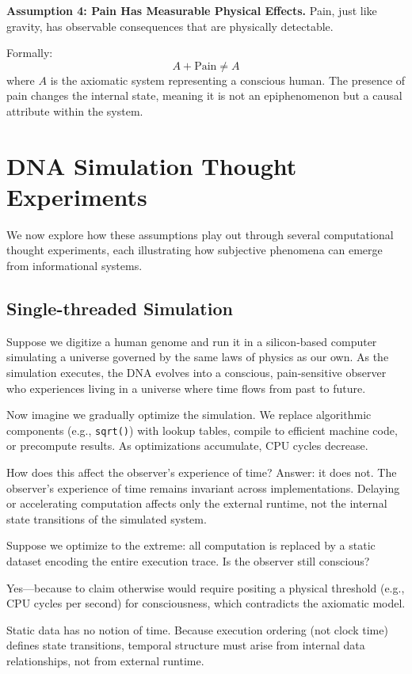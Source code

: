 \documentclass[11pt]{article}
\begin{document}
\textbf{Assumption 4: Pain Has Measurable Physical Effects.}
Pain, just like gravity, has observable consequences that are physically detectable.

Formally:
\[
  A + \text{Pain} \neq A
\]
where \( A \) is the axiomatic system representing a conscious human. The presence of pain changes the internal state, meaning it is not an epiphenomenon but a causal attribute within the system.


\section{DNA Simulation Thought Experiments}

We now explore how these assumptions play out through several computational thought experiments, each illustrating how subjective phenomena can emerge from informational systems.

\subsection{Single-threaded Simulation}

Suppose we digitize a human genome and run it in a silicon-based computer simulating a universe governed by the same laws of physics as our own. As the simulation executes, the DNA evolves into a conscious, pain-sensitive observer who experiences living in a universe where time flows from past to future.

Now imagine we gradually optimize the simulation. We replace algorithmic components (e.g., \texttt{sqrt()}) with lookup tables, compile to efficient machine code, or precompute results. As optimizations accumulate, CPU cycles decrease.

How does this affect the observer's experience of time? Answer: it does not. The observer’s experience of time remains invariant across implementations. Delaying or accelerating computation affects only the external runtime, not the internal state transitions of the simulated system.

Suppose we optimize to the extreme: all computation is replaced by a static dataset encoding the entire execution trace. Is the observer still conscious?

Yes—because to claim otherwise would require positing a physical threshold (e.g., CPU cycles per second) for consciousness, which contradicts the axiomatic model.

Static data has no notion of time. Because execution ordering (not clock time) defines state transitions, temporal structure must arise from internal data relationships, not from external runtime.
\end{document}
